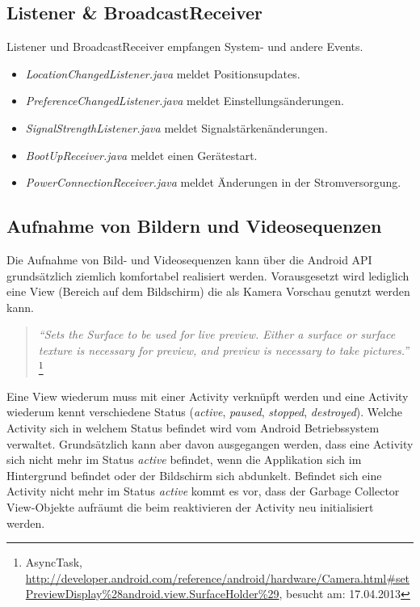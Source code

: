 \subsection{Listener \& BroadcastReceiver}
Listener und BroadcastReceiver empfangen System- und andere Events. 
\begin{itemize} [noitemsep,topsep=0pt]
	\item \textit{LocationChangedListener.java} meldet Positionsupdates. \cite{androidlocation2010}
	\item \textit{PreferenceChangedListener.java} meldet Einstellungsänderungen.
	\item \textit{SignalStrengthListener.java} meldet Signalstärkenänderungen.
	\item \textit{BootUpReceiver.java} meldet einen Gerätestart.
	\item \textit{PowerConnectionReceiver.java} meldet Änderungen in der Stromversorgung. \citep{broadcastreceiver2013}
\end{itemize}

\subsection{Aufnahme von Bildern und Videosequenzen}
Die Aufnahme von Bild- und Videosequenzen kann über die Android API grundsätzlich ziemlich komfortabel realisiert werden. Vorausgesetzt wird lediglich eine View (Bereich auf dem Bildschirm) die als Kamera Vorschau genutzt werden kann. 

\begin{quotation}
\textit{``Sets the Surface to be used for live preview. Either a surface or surface texture is necessary for preview, and preview is necessary to take pictures.''} \footnote{AsyncTask, \url{http://developer.android.com/reference/android/hardware/Camera.html\#setPreviewDisplay\%28android.view.SurfaceHolder\%29}, besucht am: 17.04.2013}
\end{quotation}

Eine View wiederum muss mit einer Activity verknüpft werden und eine Activity wiederum kennt verschiedene Status (\textit{active}, \textit{paused}, \textit{stopped}, \textit{destroyed}). Welche Activity sich in welchem Status befindet wird vom Android Betriebssystem verwaltet. Grundsätzlich kann aber davon ausgegangen werden, dass eine Activity sich nicht mehr im Status \textit{active} befindet, wenn die Applikation sich im Hintergrund befindet oder der Bildschirm sich abdunkelt. Befindet sich eine Activity nicht mehr im Status \textit{active} kommt es vor, dass der Garbage Collector View-Objekte aufräumt die beim reaktivieren der Activity neu initialisiert werden.

